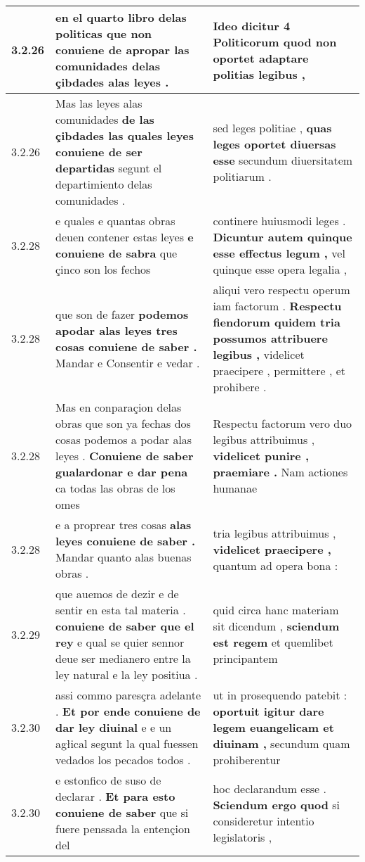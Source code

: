\begin{tabular}{|p{1cm}|p{6.5cm}|p{6.5cm}|}
3.2.26 & en el quarto libro delas politicas \textbf{ que non conuiene de apropar las comunidades } delas çibdades alas leyes . & Ideo dicitur 4 Politicorum \textbf{ quod non oportet } adaptare politias legibus , \\\hline
3.2.26 & Mas las leyes alas comunidades \textbf{ de las çibdades las quales leyes conuiene de ser departidas } segunt el departimiento delas comunidades . & sed leges politiae , \textbf{ quas leges oportet diuersas esse } secundum diuersitatem politiarum . \\\hline
3.2.28 & e quales e quantas obras deuen contener estas leyes \textbf{ e conuiene de sabra } que çinco son los fechos & continere huiusmodi leges . \textbf{ Dicuntur autem quinque esse effectus legum , } vel quinque esse opera legalia , \\\hline
3.2.28 & que son de fazer \textbf{ podemos apodar alas leyes tres cosas conuiene de saber . } Mandar e Consentir e vedar . & aliqui vero respectu operum iam factorum . \textbf{ Respectu fiendorum quidem tria possumos attribuere legibus , } videlicet praecipere , permittere , et prohibere . \\\hline
3.2.28 & Mas en conparaçion delas obras que son ya fechas dos cosas podemos a podar alas leyes . \textbf{ Conuiene de saber gualardonar e dar pena } ca todas las obras de los omes & Respectu factorum vero duo legibus attribuimus , \textbf{ videlicet punire , praemiare . } Nam actiones humanae \\\hline
3.2.28 & e a proprear tres cosas \textbf{ alas leyes conuiene de saber . } Mandar quanto alas buenas obras . & tria legibus attribuimus , \textbf{ videlicet praecipere , } quantum ad opera bona : \\\hline
3.2.29 & que auemos de dezir e de sentir en esta tal materia . \textbf{ conuiene de saber que el rey } e qual se quier sennor deue ser medianero entre la ley natural e la ley positiua . & quid circa hanc materiam sit dicendum , \textbf{ sciendum est regem } et quemlibet principantem \\\hline
3.2.30 & assi commo paresçra adelante . \textbf{ Et por ende conuiene de dar ley diuinal } e e un agłical segunt la qual fuessen vedados los pecados todos . & ut in prosequendo patebit : \textbf{ oportuit igitur dare legem euangelicam et diuinam , } secundum quam prohiberentur \\\hline
3.2.30 & e estonfico de suso de declarar . \textbf{ Et para esto conuiene de saber } que si fuere penssada la entençion del & hoc declarandum esse . \textbf{ Sciendum ergo quod } si consideretur intentio legislatoris , \\\hline

\end{tabular}
